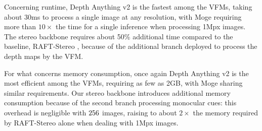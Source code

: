 Concerning runtime, Depth Anything v2 is the fastest among the VFMs, taking about 30ms to process a single image at any resolution, with Moge requiring more than $10\times$ the time for a single inference when processing 1Mpx images. 
The stereo backbone requires about 50\% additional time compared to the baseline, RAFT-Stereo \cite{lipson2021raft}, because of the additional branch deployed to process the depth maps by the VFM.


For what concerns memory consumption, once again Depth Anything v2 is the most efficient among the VFMs, requiring as few as 2GB, with Moge sharing similar requirements. Our stereo backbone introduces additional memory consumption because of the second branch processing monocular cues: this overhead is negligible with $256\time256$ images, raising to about $2\times$ the memory required by RAFT-Stereo alone when dealing with 1Mpx images.

